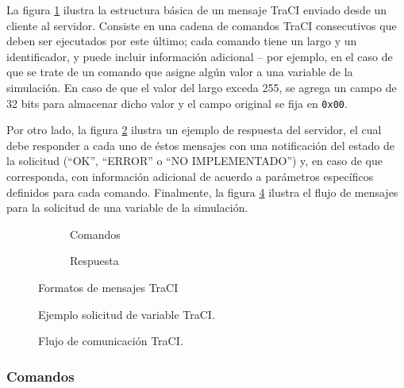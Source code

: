 La figura \ref{fig:traci_msg:command} ilustra la estructura básica de un mensaje TraCI enviado desde un cliente al servidor. Consiste en una cadena de comandos TraCI consecutivos que deben ser ejecutados por este último; cada comando tiene un largo y un identificador, y puede incluir información adicional -- por ejemplo, en el caso de que se trate de un comando que asigne algún valor a una variable de la simulación. En caso de que el valor del largo exceda 255, se agrega un campo de 32 bits para almacenar dicho valor y el campo original se fija en \texttt{0x00}.

Por otro lado, la figura \ref{fig:traci_msg:response} ilustra un ejemplo de respuesta del servidor, el cual debe responder a cada uno de éstos mensajes con una notificación del estado de la solicitud (``OK'', ``ERROR'' o ``NO IMPLEMENTADO'') y, en caso de que corresponda, con información adicional de acuerdo a parámetros específicos definidos para cada comando. Finalmente, la figura \ref{fig:tracigetversion} ilustra el flujo de mensajes para la solicitud de una variable de la simulación.

\begin{figure}[t]
    \begin{subfigure}{.3\textwidth}
        \centering
        
        \caption{Comandos}
        \label{fig:traci_msg:command}
    \end{subfigure}\hspace{0.2\textwidth}%
    \begin{subfigure}{.3\textwidth}
        \centering
        
        \caption{Respuesta}
        \label{fig:traci_msg:response}
    \end{subfigure}
    \caption{Formatos de mensajes TraCI}  
    \label{fig:traci_msg}  
\end{figure}

\begin{figure}
    \centering
    
    \caption{Ejemplo solicitud de variable TraCI.}
    \label{fig:tracigetversion}
\end{figure}

\begin{figure}
    \centering
    
    \caption{Flujo de comunicación TraCI.}
    \label{fig:traciflow}
\end{figure}


\subsubsection{Comandos}

